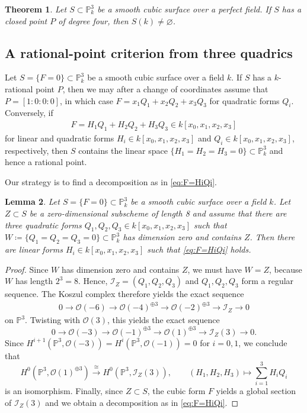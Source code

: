 \documentclass[a4paper,11pt]{amsart}
\numberwithin{equation}{section}
\newtheorem{theorem}{Theorem}[section]
\newtheorem{lemma}[theorem]{Lemma}
\theoremstyle{definition}
\theoremstyle{remark}
\newcommand{\PP}{\mathbb P}
\newcommand{\CP}{\PP}
\begin{document}
\begin{theorem}\label{thm:4->1}
Let $S\subset\PP^{3}_k$ be a smooth cubic surface over a perfect
field. If $S$ has a closed point $P$ of degree four, then $S(k)\ne\varnothing$.
\end{theorem}
 

\subsection{A rational-point criterion from three quadrics} \label{subsec:3-quadrics-criterion}

Let $S=\{F=0\}\subset \CP^3_k$ be a smooth cubic surface over a field $k$.
If $S$ has a $k$-rational point $P$, then we may after a change of coordinates assume that $P=[1:0:0:0]$, in which case $F=x_1Q_1+x_2Q_2+x_3Q_3$ for quadratic forms $Q_i$.
Conversely, if 
\begin{align}\label{eq:F=HiQi}
F=H_1Q_1+H_2Q_2+H_3Q_3\in k[x_0,x_1,x_2,x_3]
\end{align}
for linear and quadratic forms $H_i\in k[x_0,x_1,x_2,x_3]$ and $Q_i\in k[x_0,x_1,x_2,x_3]$, respectively, then $S$ contains the linear space $\{H_1=H_2=H_3=0\}\subset \CP^3_k$ 
and hence a rational point.

Our strategy is to find a decomposition as in \eqref{eq:F=HiQi}.

\begin{lemma} \label{lem:net-of-quadrics}
Let $S=\{F=0\}\subset \CP^3_k$ be a smooth cubic surface over a field $k$.
Let $Z\subset S$ be a zero-dimensional subscheme of length 8 and assume that there are three quadratic forms $Q_1,Q_2,Q_3\in k[x_0,x_1,x_2,x_3]$ such that $W\coloneq \{Q_1=Q_2=Q_3=0\}\subset \CP^3_k$ has dimension zero and contains $Z$.
Then there are linear forms $H_i\in k[x_0,x_1,x_2,x_3]$ such that \eqref{eq:F=HiQi} holds. 
\end{lemma}
\begin{proof}
Since $W$ has dimension zero and contains $Z$, we must have $W=Z$, because $W$ has length $2^3=8$.
Hence, $\mathcal I_Z=(Q_1,Q_2,Q_3)$ and $Q_1,Q_2,Q_3$ form a regular sequence. 
The Koszul complex therefore yields the exact sequence
\begin{align} \label{eq:koszul}
0 \longrightarrow \mathcal O(-6) \longrightarrow \mathcal O(-4)^{\oplus 3} \longrightarrow \mathcal O(-2)^{\oplus 3} \longrightarrow  \mathcal I_{Z } \longrightarrow 0 
\end{align}
on $\CP^3$. 
Twisting with $\mathcal O(3)$, this yields the exact sequence
\[
0 \longrightarrow \mathcal O(-3) \longrightarrow \mathcal O(-1)^{\oplus 3} \longrightarrow \mathcal O(1)^{\oplus 3} \longrightarrow  \mathcal I_{Z}(3) \longrightarrow 0.
\]
Since $H^{i+1}(\CP^3,\mathcal O(-3))=H^i(\CP^3,\mathcal O(-1))=0$ for $i=0,1$, we conclude that 
$$
H^0(\CP^3,\mathcal O(1)^{\oplus 3} )\stackrel{\cong}\longrightarrow H^0(\CP^3, \mathcal I_{Z}(3)),\qquad (H_1,H_2,H_3)\mapsto \sum_{i=1}^3 H_iQ_i
$$
is an isomorphism.
Finally, since $Z\subset S$, the cubic form $F$ yields a global section of $\mathcal I_{Z}(3)$ and we obtain a decomposition as in \eqref{eq:F=HiQi}.
\end{proof}
\end{document}
